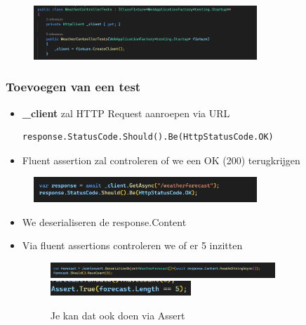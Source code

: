 \documentclass{article}
\begin{document}
\begin{figure}[H]
    \centering
    \includegraphics[width=0.75\textwidth]{integration-test1.png}
\end{figure}


\subsubsection{Toevoegen van een test}

\begin{itemize}
    \item \textbf{\_client} zal HTTP Request aanroepen via URL
\begin{verbatim}
response.StatusCode.Should().Be(HttpStatusCode.OK)
\end{verbatim}
    \item Fluent assertion zal controleren of we een OK (200) terugkrijgen
\end{itemize}

\begin{figure}[H]
    \centering
    \includegraphics[width=0.75\textwidth]{integration-test2.png}
\end{figure}

\begin{itemize}
    \item We deserialiseren de response.Content
    \item Via fluent assertions controleren we of er 5 inzitten
    \begin{figure}[H]
        \centering
        \includegraphics[width=0.8\textwidth]{integration-test3.png}
        \includegraphics[width=0.5\textwidth]{integration-test4.png}
        \caption{Je kan dat ook doen via Assert}
    \end{figure}
\end{itemize}
\end{document}
